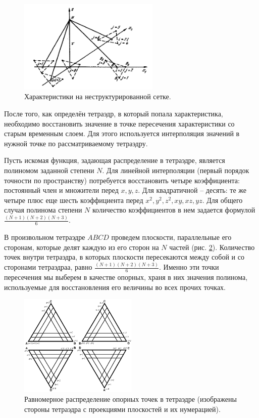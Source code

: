 \begin{figure}[h]
\centering
\includegraphics[width=0.6\textwidth]{png/characteristics-2d-triangles-inner.png}
\caption{Характеристики на неструктурированной сетке.}
\label{pic:gcm_2d}
\end{figure}

После того, как определён тетраэдр, в который попала характеристика, необходимо восстановить значение в точке пересечения характеристики со старым временным слоем. Для этого используется интерполяция значений в нужной точке по рассматриваемому тетраэдру.

Пусть искомая функция, задающая распределение в тетраэдре, является полиномом заданной степени $N$. Для линейной интерполяции (первый порядок точности по пространству) потребуется восстановить четыре коэффициента: постоянный член и множители перед $x, y, z$. Для квадратичной -- десять: те же четыре плюс еще шесть коэффициента перед $x^2, y^2, z^2, xy, xz, yz$. Для общего случая полинома степени $N$ количество коэффициентов в нем задается формулой $\frac{(N+1)(N+2)(N+3)}{6}$.

В произвольном тетраэдре $ABCD$ проведем плоскости, параллельные его сторонам, которые делят каждую из его сторон на $N$ частей (рис. \ref{pic:tetr-interpolation-base-points}). Количество точек внутри тетраэдра, в которых плоскости пересекаются между собой и со сторонами тетраэдраа, равно $\frac{(N+1)(N+2)(N+3)}{6}$. Именно эти точки пересечения мы выберем в качестве опорных, храня в них значения полинома, используемые для восстановления его величины во всех прочих точках.

\begin{figure}[h]
\centering
\includegraphics[width=0.5\textwidth]{png/tetr-interpolation-base-points.png}
\caption{Равномерное распределение опорных точек в тетраэдре (изображены стороны тетраэдра с проекциями плоскостей и их нумерацией).}
\label{pic:tetr-interpolation-base-points}
\end{figure}

